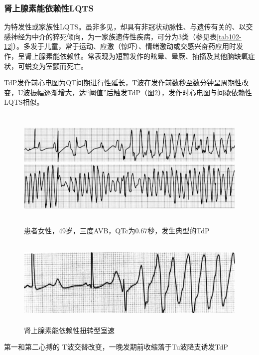 \subsubsection{肾上腺素能依赖性LQTS}

为特发性或家族性LQTS。虽非多见，却具有非冠状动脉性、与遗传有关的、以交感神经为中介的猝死倾向，为一家族遗传性疾病，可分为3类（参见表\ref{tab102-12}）。多发于儿童，常于运动、应激（惊吓）、情绪激动或交感兴奋药应用时发作，呈肾上腺素能依赖性。常表现为短暂发作的眩晕、晕厥、抽搐及其他脑缺氧症状，可蜕变为室颤而死亡。

TdP发作前心电图为QT间期进行性延长，T波在发作前数秒至数分钟呈周期性改变，U波振幅逐渐增大，达“阈值”后触发TdP（图\ref{fig102-12}），发作时心电图与间歇依赖性LQTS相似。

\begin{figure}[!htbp]
 \centering
 \includegraphics[width=5.89583in,height=2.28125in]{./images/Image00445.jpg}
 \captionsetup{justification=centering}
 \caption{患者女性，49岁，三度AVB，QTc为0.67秒，发生典型的TdP}
 \label{fig102-11}
  \end{figure} 

\begin{figure}[!htbp]
 \centering
 \includegraphics[width=5.89583in,height=1.6875in]{./images/Image00446.jpg}
 \captionsetup{justification=centering}
 \caption{肾上腺素能依赖性扭转型室速}
 \label{fig102-12}
  \end{figure} 

第一和第二心搏的 T波交替改变，一晚发期前收缩落于Tu波降支诱发TdP

